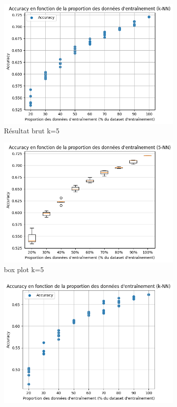 \documentclass[12pt]{article}
\begin{document}
\begin{figure}[H]
\begin{subfigure}[t]{0.35\textwidth}
        \includegraphics[width=\textwidth]{static/knn_cam_5_raw.png}
        \caption{Résultat brut k=5}
    \end{subfigure}
    \hfill
    \begin{subfigure}[t]{0.35\textwidth}
        \centering
        \includegraphics[width=\textwidth]{static/knn_cam_5.png}
        \caption{box plot k=5}
    \end{subfigure}
    \hfill
    \begin{subfigure}[t]{0.35\textwidth}
        \centering
        \includegraphics[width=\textwidth]{static/knn_cam_10_raw.png}

\end{subfigure}
\end{figure}
\end{document}
